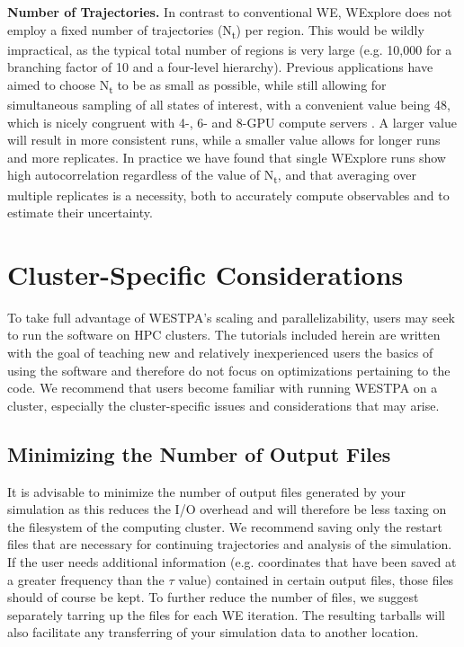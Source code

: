 \documentclass[9pt,tutorial]{livecoms}
\begin{document}
\textbf{Number of Trajectories.} In contrast to conventional WE, WExplore does not employ a fixed number of trajectories (N\textsubscript{t}) per region. 
This would be wildly impractical, as the typical total number of regions is very large (e.g. 10,000 for a branching factor of 10 and a four-level hierarchy). 
Previous applications have aimed to choose N\textsubscript{t} to be as small as possible, while still allowing for simultaneous sampling of all states of interest, with a convenient value being 48, which is nicely congruent with 4-, 6- and 8-GPU compute servers \citep{Dickson2017,Dixon2018,Lotz2018}. 
A larger value will result in more consistent runs, while a smaller value allows for longer runs and more replicates. 
In practice we have found that single WExplore runs show high autocorrelation regardless of the value of N\textsubscript{t}, and that averaging over multiple replicates is a necessity, both to accurately compute observables and to estimate their uncertainty.

\section{Cluster-Specific Considerations}

To take full advantage of WESTPA’s scaling and parallelizability, users may seek to run the software on HPC clusters.
The tutorials included herein are written with the goal of teaching new and relatively inexperienced users the basics of using the software and therefore do not focus on optimizations pertaining to the code. 
We recommend that users become familiar with running WESTPA on a cluster, especially the cluster-specific issues and considerations that may arise.

\subsection{Minimizing the Number of Output Files}

It is advisable to minimize the number of output files generated by your simulation as this reduces the I/O overhead and will therefore be less taxing on the filesystem of the computing cluster. 
We recommend saving only the restart files that are necessary for continuing trajectories and analysis of the simulation. 
If the user needs additional information (e.g. coordinates that have been saved at a greater frequency than the $\tau$ value) contained in certain output files, those files should of course be kept. 
To further reduce the number of files, we suggest separately tarring up the files for each WE iteration. 
The resulting tarballs will also facilitate any transferring of your simulation data to another location. 
\end{document}
